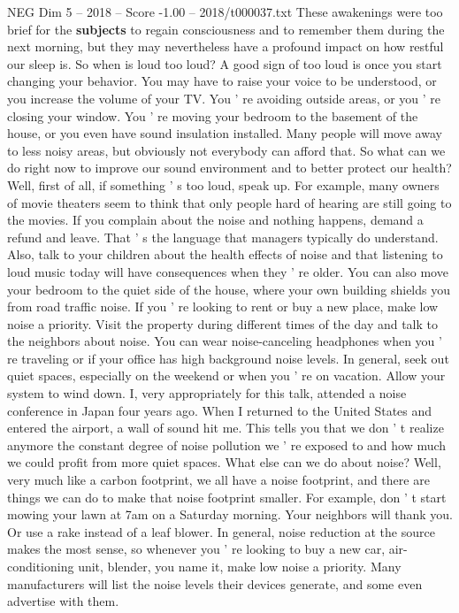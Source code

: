 \begin{textsample}{NEG Dim 5 – 2018 – Score -1.00 – 2018/t000037.txt}
These awakenings were too brief for the \textbf{subjects} to regain consciousness and to remember them during the next morning, but they may nevertheless have a profound impact on how restful our sleep is.
So when is loud too loud?
A good sign of too loud is once you start changing your behavior.
You may have to raise your voice to be understood, or you increase the volume of your TV.
You ' re avoiding outside areas, or you ' re closing your window.
You ' re moving your bedroom to the basement of the house, or you even have sound insulation installed.
Many people will move away to less noisy areas, but obviously not everybody can afford that.
So what can we do right now to improve our sound environment and to better protect our health?
Well, first of all, if something ' s too loud, speak up.
For example, many owners of movie theaters seem to think that only people hard of hearing are still going to the movies.
If you complain about the noise and nothing happens, demand a refund and leave.
That ' s the language that managers typically do understand.
Also, talk to your children about the health effects of noise and that listening to loud music today will have consequences when they ' re older.
You can also move your bedroom to the quiet side of the house, where your own building shields you from road traffic noise.
If you ' re looking to rent or buy a new place, make low noise a priority.
Visit the property during different times of the day and talk to the neighbors about noise.
You can wear noise-canceling headphones when you ' re traveling or if your office has high background noise levels.
In general, seek out quiet spaces, especially on the weekend or when you ' re on vacation.
Allow your system to wind down.
I, very appropriately for this talk, attended a noise conference in Japan four years ago.
When I returned to the United States and entered the airport, a wall of sound hit me.
This tells you that we don ' t realize anymore the constant degree of noise pollution we ' re exposed to and how much we could profit from more quiet spaces.
What else can we do about noise?
Well, very much like a carbon footprint, we all have a noise footprint, and there are things we can do to make that noise footprint smaller.
For example, don ' t start mowing your lawn at 7am on a Saturday morning.
Your neighbors will thank you.
Or use a rake instead of a leaf blower.
In general, noise reduction at the source makes the most sense, so whenever you ' re looking to buy a new car, air-conditioning unit, blender, you name it, make low noise a priority.
Many manufacturers will list the noise levels their devices generate, and some even advertise with them.

\end{textsample}
